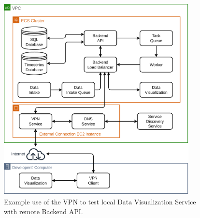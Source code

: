 \begin{figure}[!htbp]
    \centering
    \includegraphics[width=0.90\textwidth]{img/diagrams/pdf/new-arch-vpn.drawio.pdf}
    \caption[VPN Usage Example]{Example use of the VPN to test local Data Visualization Service with remote Backend API.}
    \label{fig:new-arch-vpn}
\end{figure}
